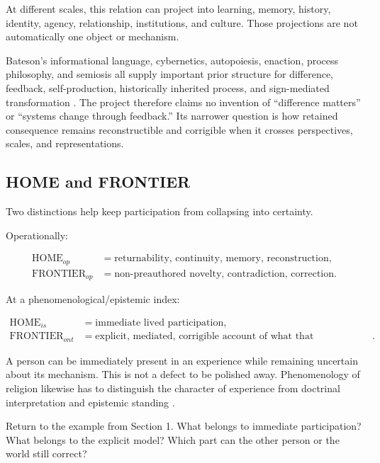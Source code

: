 \documentclass[11pt]{article}
\begin{document}
At different scales, this relation can project into learning, memory, history, identity, agency, relationship, institutions, and culture. Those projections are not automatically one object or mechanism.

Bateson's informational language, cybernetics, autopoiesis, enaction, process philosophy, and semiosis all supply important prior structure for difference, feedback, self-production, historically inherited process, and sign-mediated transformation \cite{Bateson1972,MaturanaVarela1980Autopoiesis,Pattee2001EpistemicCut,PeirceSemioticsSEP,Whitehead1978Process,VonFoerster2003Understanding}. The project therefore claims no invention of ``difference matters'' or ``systems change through feedback.'' Its narrower question is how retained consequence remains reconstructible and corrigible when it crosses perspectives, scales, and representations.

\subsection{HOME and FRONTIER}

Two distinctions help keep participation from collapsing into certainty.

Operationally:

\begin{align}
\mathrm{HOME}_{op} &= \text{returnability, continuity, memory, reconstruction},\\
\mathrm{FRONTIER}_{op} &= \text{non-preauthored novelty, contradiction, correction}.
\end{align}

At a phenomenological/epistemic index:

\begin{align}
\mathrm{HOME}_{is} &= \text{immediate lived participation},\\
\mathrm{FRONTIER}_{ont} &= \text{explicit, mediated, corrigible account of what that participation is}.
\end{align}

A person can be immediately present in an experience while remaining uncertain about its mechanism. This is not a defect to be polished away. Phenomenology of religion likewise has to distinguish the character of experience from doctrinal interpretation and epistemic standing \cite{SEPPhenomenologyReligion2024}.

\begin{readercheck}
Return to the example from Section 1. What belongs to immediate participation? What belongs to the explicit model? Which part can the other person or the world still correct?
\end{readercheck}
\end{document}
